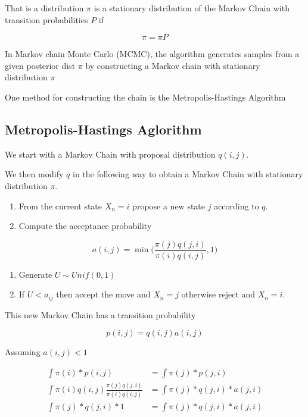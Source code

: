 \documentclass[]{article}
\providecommand{\tightlist}{%
  \setlength{\itemsep}{0pt}\setlength{\parskip}{0pt}}
\numberwithin{equation}{section}
\begin{document}
That is a distribution \(\pi\) is a stationary distribution of the
Markov Chain with transition probabilities \(P\) if

\[ \pi = \pi P \]

In Markov chain Monte Carlo (MCMC), the algorithm generates samples from
a given posterior dist \(\pi\) by constructing a Markov chain with
stationary distribution \(\pi\)

One method for constructing the chain is the Metropolis-Hastings
Algorithm

\hypertarget{metropolis-hastings-aglorithm}{%
\subsection{Metropolis-Hastings
Aglorithm}\label{metropolis-hastings-aglorithm}}

We start with a Markov Chain with proposal distribution \(q(i,j)\).

We then modify \(q\) in the following way to obtain a Markov Chain with
stationary distribution \(\pi\).

\begin{enumerate}
\def\labelenumi{\arabic{enumi}.}
\tightlist
\item
  From the current state \(X_n = i\) propose a new state \(j\) according
  to \(q\).
\item
  Compute the acceptance probability
\end{enumerate}

\[a(i,j) = \min{\big(\frac{\pi(j)q(j,i)}{\pi(i)q(i,j)},1\big) }\]

\begin{enumerate}
\def\labelenumi{\arabic{enumi}.}
\setcounter{enumi}{2}
\tightlist
\item
  Generate \(U \sim Unif(0,1)\)
\item
  If \(U < a_{ij}\) then accept the move and \(X_n = j\) otherwise
  reject and \(X_n = i\).
\end{enumerate}

This new Markov Chain has a transition probability

\[p(i,j) = q(i,j)a(i,j)\]

Assuming \(a(i,j) < 1\)

\[ \begin{aligned} \int \pi(i)*p(i,j) & = \int\pi(j)*p(j,i) \\
\int \pi(i)q(i,j)\frac{\pi(j)q(j,i)}{\pi(i)q(i,j)} & = \int\pi(j)*q(j,i)*a(j,i) \\ \int \pi(j)*q(j,i)*1 & = \int\pi(j)*q(j,i)*a(j,i)
\end{aligned}\]
\end{document}
